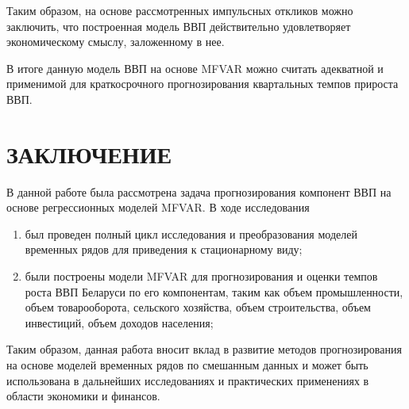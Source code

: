 \documentclass[a4paper, 14pt]{extreport}
\numberwithin{equation}{section}
\numberwithin{equation}{section}
\begin{document}
	Таким образом, на основе рассмотренных импульсных откликов можно заключить, что построенная модель ВВП действительно удовлетворяет экономическому смыслу, заложенному в нее.
	
	В итоге данную модель ВВП на основе MFVAR можно считать адекватной и применимой для краткосрочного прогнозирования квартальных темпов прироста ВВП.
	
	\newpage
	\chapter*{ЗАКЛЮЧЕНИЕ}
	В данной работе была рассмотрена задача прогнозирования компонент ВВП на основе регрессионных моделей MFVAR. В ходе исследования
	\begin{enumerate}
		\item был проведен полный цикл исследования и преобразования моделей временных рядов для приведения к стационарному виду;
		\item были построены модели MFVAR для прогнозирования и оценки темпов роста ВВП Беларуси по его компонентам, таким как объем промышленности, объем товарооборота, сельского хозяйства, объем строительства, объем инвестиций, объем доходов населения;
	\end{enumerate}
	Таким образом, данная работа вносит вклад в развитие методов прогнозирования на основе моделей временных рядов по смешанным данных и
	может быть использована в дальнейших исследованиях и практических применениях в области экономики и финансов.
\end{document}
